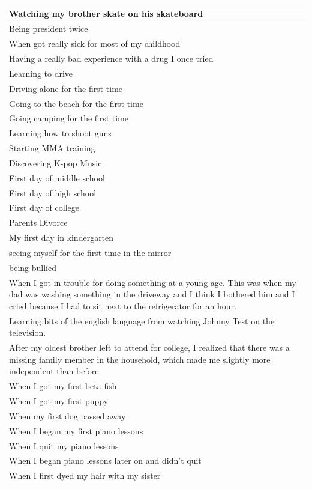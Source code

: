 \documentclass[
  .7em,
  letterpaper,
  DIV=11,
  numbers=noendperiod]{scrartcl}
\begin{document}
\begin{table}
\begin{tabular}{l}
\hline
Watching my brother skate on his skateboard\\
\hline
Being president twice\\
\hline
When got really sick for most of my childhood\\
\hline
Having a really bad experience with a drug I once tried\\
\hline
Learning to drive\\
\hline
Driving alone for the first time\\
\hline
Going to the beach for the first time\\
\hline
Going camping for the first time\\
\hline
Learning how to shoot guns\\
\hline
Starting MMA training\\
\hline
Discovering K-pop Music\\
\hline
First day of middle school\\
\hline
First day of high school\\
\hline
First day of college\\
\hline
Parents Divorce\\
\hline
My first day in kindergarten\\
\hline
seeing myself for the first time in the mirror\\
\hline
being bullied\\
\hline
When I got in trouble for doing something at a young age. This was when my dad was washing something in the driveway and I think I bothered him and I cried because I had to sit next to the refrigerator for an hour.\\
\hline
Learning bits of the english language from watching Johnny Test on the television.\\
\hline
After my oldest brother left to attend for college, I realized that there was a missing family member in the household, which made me slightly more independent than before.\\
\hline
When I got my first beta fish\\
\hline
When I got my first puppy\\
\hline
When my first dog passed away\\
\hline
When I began my first piano lessons\\
\hline
When I quit my piano lessons\\
\hline
When I began piano lessons later on and didn’t quit\\
\hline
When I first dyed my hair with my sister\\

\end{tabular}
\end{table}
\end{document}
